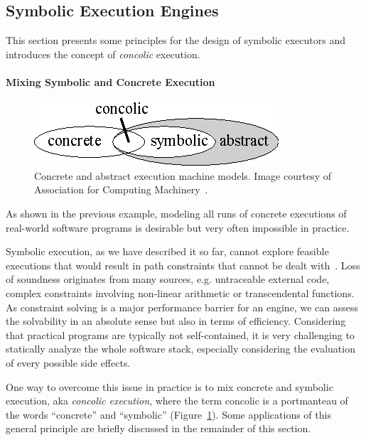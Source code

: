 \subsection{Symbolic Execution Engines}
\label{se:executors}

This section presents some principles for the design of symbolic executors and introduces the concept of {\em concolic} execution.

\paragraph{Mixing Symbolic and Concrete Execution}
\label{ss:concrete-concolic-symbolic}

\begin{figure}[t]
	\centering
	\includegraphics[width=0.32\columnwidth]{images/concrete-abstract.eps} 
	\caption{Concrete and abstract execution machine models. Image courtesy of Association for Computing Machinery~\cite{Baldoni:2018:SSE:3212709.3182657}.}
	\label{fig:concrete-symbolic}
	\vspace{-1.5mm}
\end{figure}

As shown in the previous example, modeling all runs of concrete executions of real-world software programs is desirable but very often impossible in practice.

Symbolic execution, as we have described it so far, cannot explore feasible executions that would result in path constraints that cannot be dealt with~\cite{CS-CACM13}. Loss of soundness originates from many sources, e.g. untraceable external code, complex constraints involving non-linear arithmetic or transcendental functions. As constraint solving is a major performance barrier for an engine, we can assess the solvability in an absolute sense but also in terms of efficiency. Considering that practical programs are typically not self-contained, it is very challenging to statically analyze the whole software stack, especially considering the evaluation of every possible side effects.

One way to overcome this issue in practice is to mix concrete and symbolic execution, aka {\em concolic execution}, where the term concolic is a portmanteau of the words ``concrete'' and ``symbolic'' (Figure~\ref{fig:concrete-symbolic}). Some applications of this general principle are briefly discussed in the remainder of this section.


